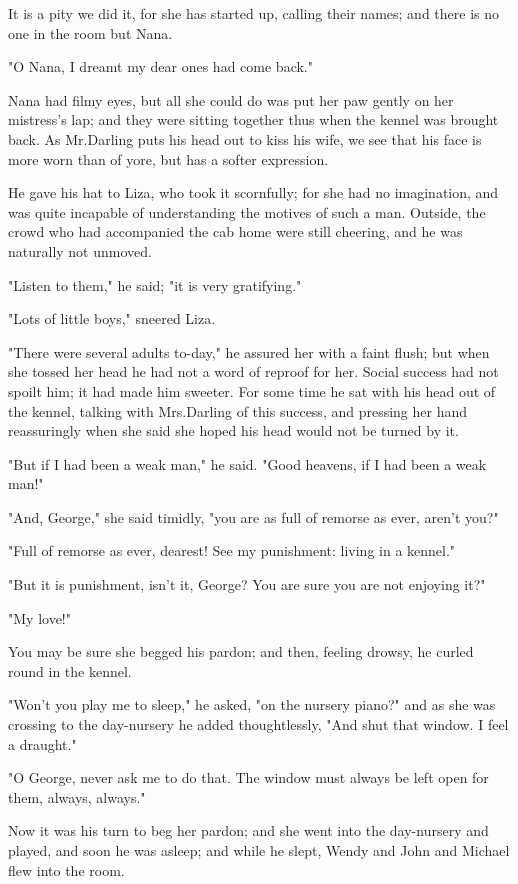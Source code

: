 It is a pity we did it, for she has started up, calling their names;
and there is no one in the room but Nana.

"O Nana, I dreamt my dear ones had come back."

Nana had filmy eyes, but all she could do was put her paw gently on her mistress's lap;
and they were sitting together thus when the kennel was brought back.
As Mr.\@ Darling puts his head out to kiss his wife,
we see that his face is more worn than of yore, but has a softer expression.

He gave his hat to Liza, who took it scornfully;
for she had no imagination, and was quite incapable of understanding the motives of such a man.
Outside, the crowd who had accompanied the cab home were still cheering,
and he was naturally not unmoved.

"Listen to them," he said;
"it is very gratifying."

"Lots of little boys," sneered Liza.

"There were several adults to-day," he assured her with a faint flush;
but when she tossed her head he had not a word of reproof for her.
Social success had not spoilt him;
it had made him sweeter.
For some time he sat with his head out of the kennel,
talking with Mrs.\@ Darling of this success,
and pressing her hand reassuringly when she said she hoped his head would not be turned by it.

"But if I had been a weak man," he said.
"Good heavens, if I had been a weak man!"

"And, George," she said timidly,
"you are as full of remorse as ever, aren't you?"

"Full of remorse as ever, dearest!
See my punishment:
living in a kennel."

"But it is punishment, isn't it, George?
You are sure you are not enjoying it?"

"My love!"

You may be sure she begged his pardon;
and then, feeling drowsy, he curled round in the kennel.

"Won't you play me to sleep," he asked, "on the nursery piano?\@"
and as she was crossing to the day-nursery he added thoughtlessly,
"And shut that window.
I feel a draught."

"O George, never ask me to do that.
The window must always be left open for them, always, always."

Now it was his turn to beg her pardon;
and she went into the day-nursery and played, and soon he was asleep;
and while he slept, Wendy and John and Michael flew into the room.

